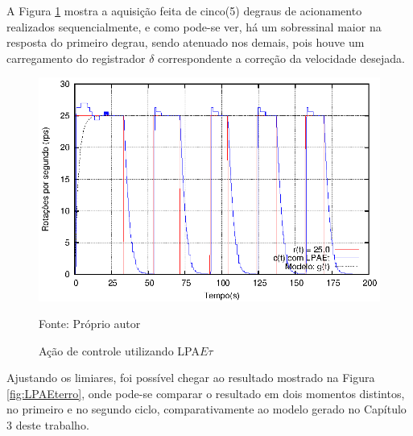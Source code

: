 
A Figura \ref{fig:acaoLPAEtDelta} mostra a aquisição feita de cinco(5) degraus de acionamento realizados sequencialmente, e como pode-se ver, há um sobressinal maior na resposta do primeiro degrau, sendo atenuado nos demais, pois houve um carregamento do registrador $\delta$ correspondente a correção da velocidade desejada.

\begin{figure}[!htb]%
\caption{Ação de controle utilizando LPA$E\tau$}
\vspace{-1cm}\center\includegraphics[scale=1.6]{./imagens/LPAEt-delta.eps}
\label{fig:acaoLPAEtDelta}

{\small Fonte: Próprio autor}
\end{figure}


Ajustando os limiares, foi possível chegar ao resultado mostrado na Figura \ref{fig:LPAEterro}, 
onde pode-se comparar o resultado em dois momentos distintos, no primeiro e no segundo ciclo, comparativamente ao modelo gerado no Capítulo 3 deste trabalho.


